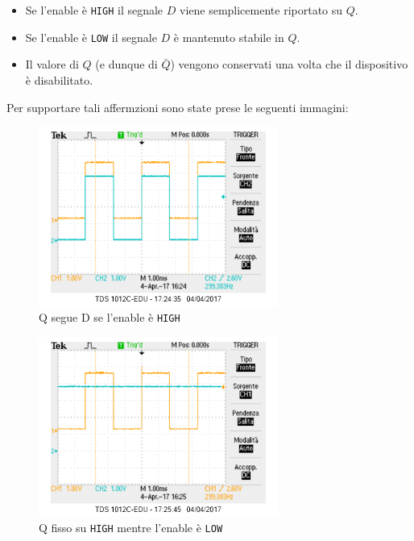 \documentclass[a4paper,10pt]{article}
\def\code#1{\texttt{#1}}
\begin{document}
\begin{itemize}
\item Se l'enable è \code{HIGH} il segnale $D$ viene semplicemente riportato su $Q$.
\item Se l'enable è \code{LOW} il segnale $D$ è mantenuto stabile in $Q$.
\item Il valore di $Q$ (e dunque di $\bar{Q}$) vengono conservati una volta che il dispositivo è disabilitato.
\end{itemize}

Per supportare tali affermzioni sono state prese le seguenti immagini:


\begin{figure}[H]
	\centering
	\includegraphics[width=0.7\textwidth]{../grafici/enableUp.png}
	\caption{Q segue D se l'enable è \code{HIGH}}
	\label{fig:FFD}
\end{figure}

\begin{figure}[H]
	\centering
	\includegraphics[width=0.7\textwidth]{../grafici/EnableDown0.png}
	\caption{Q fisso su \code{HIGH} mentre l'enable è \code{LOW}}
	\label{fig:FFD}
\end{figure}
\end{document}
